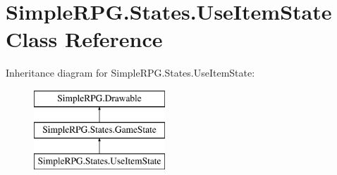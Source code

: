 \hypertarget{class_simple_r_p_g_1_1_states_1_1_use_item_state}{\section{Simple\-R\-P\-G.\-States.\-Use\-Item\-State Class Reference}
\label{class_simple_r_p_g_1_1_states_1_1_use_item_state}
}
Inheritance diagram for Simple\-R\-P\-G.\-States.\-Use\-Item\-State\-:\begin{figure}[H]
\begin{center}
\leavevmode
\includegraphics[height=3.000000cm]{class_simple_r_p_g_1_1_states_1_1_use_item_state}
\end{center}
\end{figure}
